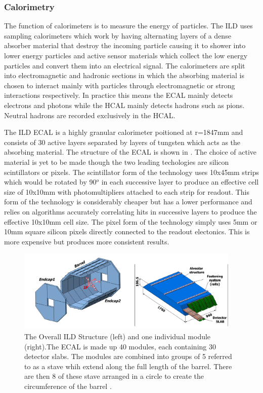 \subsubsection{Calorimetry}

The function of calorimeters is to measure the energy of particles. The ILD uses sampling calorimeters which work by having alternating layers of a dense absorber material that destroy the incoming particle causing it to shower into lower energy particles and active sensor materials which collect the low energy particles and convert them into an electrical signal. The calorimeters are split into electromagnetic and hadronic sections in which the absorbing material is chosen to interact mainly with particles through electromagnetic or strong interactions respectively. In practice this means the \ac{ECAL} mainly detects electrons and photons while the \ac{HCAL} mainly detects hadrons such as pions. Neutral hadrons are recorded exclusively in the \ac{HCAL}.

The ILD ECAL is a highly granular calorimeter poitioned at r=1847mm and consists of 30 active layers separated by layers of tungsten which acts as the absorbing material. The structure of the \ac{ECAL} is shown in . The choice of active material is yet to be made though the two leading techologies are silicon scintillators or pixels. The scintillator form of the technology uses 10x45mm strips which would be rotated by 90${^o}$ in each successive layer to produce an effective cell size of 10x10mm with photomultipliers attached to each strip for readout. This form of the technology is considerably cheaper but has a lower performance and relies on algorithms accurately correlating hits in successive layers to produce the effective 10x10mm cell size. The pixel form of the technology simply uses 5mm or 10mm square silicon pixels directly connected to the readout electonics. This is more expensive but produces more consistent results.

\begin{figure}[h]
  \centering
  \includegraphics[width=0.95\textwidth,keepaspectratio]{Experiments/fig/ecalstructure} %
  \caption[ECAL Structure]{The Overall ILD Structure (left) and one individual module (right).The ECAL is made up 40 modules, each containing 30 detector slabs. The modules are combined into groups of 5 referred to as a stave whih extend along the full length of the barrel. There are then 8 of these stave arranged in a circle to create the circumference of the barrel \cite{ILD}.}
  \label{Fig:ECAL}
\end{figure}

